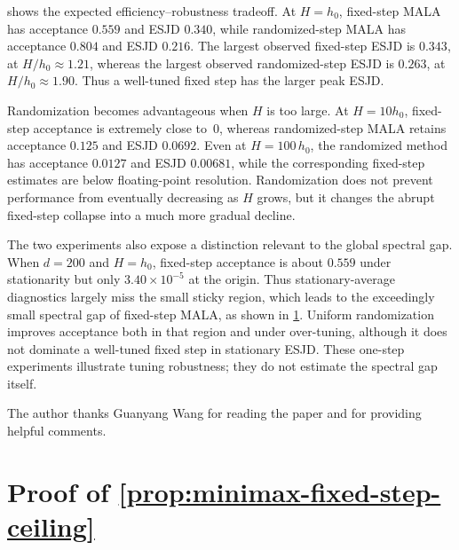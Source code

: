 \documentclass[11pt]{article}
\newcommand{\1}{\mathbf 1}
\begin{document}
	 shows the expected
	efficiency--robustness tradeoff.  At \(H=h_0\), fixed-step MALA has
	acceptance \(0.559\) and ESJD \(0.340\), while randomized-step MALA has
	acceptance \(0.804\) and ESJD \(0.216\).  The largest observed fixed-step
	ESJD is \(0.343\), at \(H/h_0\approx1.21\), whereas the largest observed
	randomized-step ESJD is \(0.263\), at \(H/h_0\approx1.90\).  Thus a
	well-tuned fixed step has the larger peak ESJD.
	
	Randomization becomes advantageous when $H$ is too large.  
	At \(H=10h_0\), fixed-step acceptance is
	extremely close to~0, whereas randomized-step MALA retains
	acceptance \(0.125\) and ESJD \(0.0692\).  Even at \(H=100 \, h_0\), the
	randomized method has acceptance \(0.0127\) and ESJD \(0.00681\), while the
	corresponding fixed-step estimates are below floating-point resolution.
	Randomization does not prevent performance from eventually decreasing as
	\(H\) grows, but it changes the abrupt fixed-step collapse into a much more
	gradual decline.
	
	The two experiments also expose a distinction relevant to the global
	spectral gap.  When \(d=200\) and \(H=h_0\), fixed-step acceptance is about
	\(0.559\) under stationarity but only \(3.40\times10^{-5}\) at the origin.
	Thus stationary-average diagnostics largely miss the small sticky region, which leads to the exceedingly small spectral gap of fixed-step MALA, as shown in \cref{app:fixed-step-obstruction}.
	Uniform randomization improves
	acceptance both in that region and under over-tuning, although it does not
	dominate a well-tuned fixed step in stationary ESJD.  These one-step
	experiments illustrate tuning robustness; they do not estimate the spectral
	gap itself.
	
	
	\bigskip
	
	 The author thanks Guanyang Wang for reading the paper and for providing helpful comments.
	
	\vspace{2cm}
	
	
	\appendix
	
	\section{Proof of \cref{prop:minimax-fixed-step-ceiling}}
	\label{app:fixed-step-obstruction}
	
\end{document}
